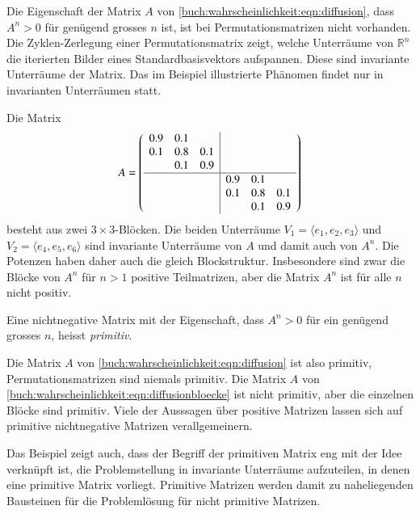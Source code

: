 Die Eigenschaft der Matrix $A$ von
\eqref{buch:wahrscheinlichkeit:eqn:diffusion}, dass $A^n>0$
für genügend grosses $n$ ist, ist bei Permutationsmatrizen nicht
vorhanden.
Die Zyklen-Zerlegung einer Permutationsmatrix zeigt, welche
Unterräume von $\mathbb{R}^n$ die iterierten Bilder eines
Standardbasisvektors aufspannen.
Diese sind invariante Unterräume der Matrix.
Das im Beispiel illustrierte Phänomen findet nur in invarianten
Unterräumen statt.

\begin{beispiel}
Die Matrix
\begin{equation}
A=\left(\begin{array}{ccc|ccc}
0.9&0.1&   &   &   &   \\
0.1&0.8&0.1&   &   &   \\
   &0.1&0.9&   &   &   \\
\hline
   &   &   &0.9&0.1&   \\
   &   &   &0.1&0.8&0.1\\
   &   &   &   &0.1&0.9
\end{array}
\right)
\label{buch:wahrscheinlichkeit:eqn:diffusionbloecke}
\end{equation}
besteht aus zwei $3\times 3$-Blöcken.
Die beiden Unterräume $V_1=\langle e_1,e_2,e_3\rangle$
und $V_2=\langle e_4,e_5,e_6\rangle$ sind invariante
Unterräume von $A$ und damit auch von $A^n$.
Die Potenzen haben daher auch die gleich Blockstruktur.
Insbesondere sind zwar die Blöcke von $A^n$ für $n>1$ positive
Teilmatrizen, aber die Matrix $A^n$ ist für alle $n$ nicht positiv.
\end{beispiel}

\begin{definition}
\label{buch:positiv:def:primitiv}
Eine nichtnegative Matrix mit der Eigenschaft, dass $A^n>0$ für
ein genügend grosses $n$, heisst {\em primitiv}.
%
\end{definition}

Die Matrix $A$ von \eqref{buch:wahrscheinlichkeit:eqn:diffusion}
ist also primitiv, Permutationsmatrizen sind niemals primitiv.
Die Matrix $A$ von \eqref{buch:wahrscheinlichkeit:eqn:diffusionbloecke}
ist nicht primitiv, aber die einzelnen Blöcke sind primitiv.
Viele der Ausssagen über positive Matrizen lassen sich auf primitive
nichtnegative Matrizen verallgemeinern.

Das Beispiel zeigt auch, dass der Begriff der primitiven Matrix 
eng mit der Idee verknüpft ist, die Problemstellung in invariante
Unterräume aufzuteilen, in denen eine primitive Matrix vorliegt.
Primitive Matrizen werden damit zu naheliegenden Bausteinen für
die Problemlösung für nicht primitive Matrizen.

